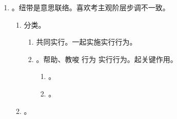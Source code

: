 \begin{enumerate}
\begin{enumerate}
                \begin{enumerate}
                  \item 任意的共同犯罪。人数 。
                  \item 必要的共同犯罪。人数 。对合/对向犯。缺少一方，另一方无法单独构成犯罪。
                        \begin{enumerate}
                          \item 罪名、法定刑相同。。
                          \item 罪名、法定刑不同。。
                        \end{enumerate}
                  \item {}。
                        。
                \end{enumerate}
          \item vs 犯罪集团。
                \begin{enumerate}
                  \item 3 人以上为实施一次或多次犯罪，经事前通谋而建立的犯罪组织。是共同犯罪的一种特殊形式。
                  \item 首要分子都是主犯。按集团所犯的全部罪行处罚。
                \end{enumerate}
        \end{enumerate}
  \item {}。纽带是意思联络。喜欢考主观阶层步调不一致。
        \begin{enumerate}
          \item 分类。
                \begin{enumerate}
                  \item 共同实行。一起实施实行行为。
                  \item {}。帮助、教唆 \xyh 行为 \xyh 实行行为。起关键作用。
                        \begin{enumerate}
                          \item {}。
                          \item {}。
                        \end{enumerate}
                \end{enumerate}
          \item {}。

\end{enumerate}
\end{enumerate}
